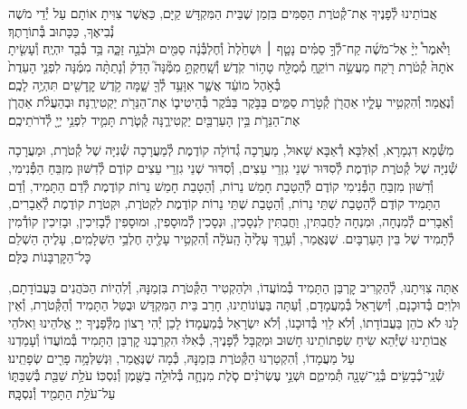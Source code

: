 \documentclass[twoside, openany, parskip=half, 11pt]{book}
\begin{document}
\newcommand{\ketoret}{
\firstword{אַתָּה הוּא יְיָ אֱלֹהֵינוּ שֶׁהִקְטִירוּ}
אֲבוֹתֵינוּ לְ֯פָנֶיךָ אֶת־קְ֯טֹרֶת הַסַּמִּים בִּזְמַן שֶׁבֵּית הַמִּקְדָּשׁ קַיָּם, כַּאֲשֶׁר צִוִּיתָ אוֹתָם עַל יְ֯דֵי מֹשֶׁה נְ֯בִיאֶךָ, כַּכָּתוּב בְּ֯תוֹרָתֶךָ׃\\
וַיֹּ֩אמֶר֩ יְיָ֨ אֶל־מֹשֶׁ֜ה קַח־לְ֯ךָ֣ סַמִּ֗ים\source{שמות ל} נָטָ֤ף ׀ וּשְׁחֵ֙לֶת֙ וְ֯חֶלְבְּ֯נָ֔ה סַמִּ֖ים וּלְבֹנָ֣ה זַכָּ֑ה בַּ֥ד בְּ֯בַ֖ד יִהְיֶֽה׃ וְ֯עָשִׂ֤יתָ אֹתׇהּ֙ קְ֯טֹ֔רֶת רֹ֖קַח מַעֲשֵׂ֣ה רוֹקֵ֑חַ מְ֯מֻלָּ֖ח טָה֥וֹר קֹֽדֶשׁ׃ וְ֯שָֽׁחַקְתָּ֣ מִמֶּ֘נָּה֮ הָדֵק֒ וְ֯נָתַתָּ֨ה מִמֶּ֜נָּה לִפְנֵ֤י הָעֵדֻת֙ בְּ֯אֹ֣הֶל מוֹעֵ֔ד אֲשֶׁ֛ר אִוָּעֵ֥ד לְ֯ךָ֖ שָׁ֑מָּה קֹ֥דֶשׁ קׇֽדָשִׁ֖ים תִּהְיֶ֥ה לָכֶֽם׃\\
וְ֯נֶאֱמַר׃ וְ֯הִקְטִ֥יר עָלָ֛יו אַהֲרֹ֖ן קְ֯טֹ֣רֶת סַמִּ֑ים בַּבֹּ֣קֶר בַּבֹּ֗קֶר בְּ֯הֵיטִיב֛וֹ אֶת־הַנֵּרֹ֖ת יַקְטִירֶֽנָּה׃ וּבְהַעֲלֹ֨ת אַהֲרֹ֧ן אֶת־הַנֵּרֹ֛ת בֵּ֥ין הָעַרְבַּ֖יִם יַקְטִירֶ֑נָּה קְ֯טֹ֧רֶת תָּמִ֛יד לִפְנֵ֥י יְיָ֖ לְ֯דֹרֹתֵיכֶֽם׃


}
\\
\tamid
\\
\ketoret
{}  מִשְּׁ֯מָא דִגְמָרָא, וְ֯אַלִּבָּא דְ֯אַבָּא שָׁאוּל, מַעֲרָכָה גְ֯דוֹלָה קוֹדֶמֶת לְ֯מַעֲרָכָה שְׁ֯נִיָּה שֶׁל קְ֯טֹרֶת, וּמַעֲרָכָה שְׁ֯נִיָּה שֶׁל קְ֯טֹרֶת קוֹדֶמֶת לְ֯סִדּוּר שְׁנֵי גִזְרֵי עֵצִים, וְ֯סִדּוּר שְׁנֵי גִזְרֵי עֵצִים קוֹדֶם לְ֯דִשּׁוּן מִזְבֵּחַ הַפְּ֯נִימִי, וְ֯דִשּׁוּן מִזְבֵּחַ הַפְּ֯נִימִי קוֹדֶם לְ֯הַטָבַת חָמֵשׁ נֵרוֹת, וְ֯הַטָבַת חָמֵשׁ נֵרוֹת קוֹדֶמֶת לְ֯דַם הַתָּמִיד, וְ֯דַם הַתָּמִיד קוֹדֶם לְ֯הַטָבַת שְׁתֵּי נֵרוֹת, וְ֯הַטָבַת שְׁתֵּי נֵרוֹת קוֹדֶמֶת לִקְטֹרֶת, וּקְטֹרֶת קוֹדֶמֶת לְ֯אֵבָרִים, וְ֯אֵבָרִים לְ֯מִנְחָה, וּמִנְחָה לַחֲבִתִּין, וַחֲבִתִּין לִנְסָכִין, וּנְסָכִין לְ֯מוּסָפִין, וּמוּסָפִין לְ֯בָזִיכִין, וּבָזִיכִין קוֹדְ֯מִין לְ֯תָמִיד שֶׁל בֵּין הָעַרְבָּיִם. שֶׁנֶּאֱמַר, וְ֯עָרַ֤ךְ  עָלֶ֙יהָ֙ הָֽעֹלָ֔ה וְ֯הִקְטִ֥יר עָלֶ֖יהָ חֶלְבֵ֥י הַשְּׁלָמִֽים׃, עָלֶיהָ הַשְׁלֵם כׇּל־הַקׇּרְבָּנוֹת כֻּלָּם׃

 אַתָּה צִוִּיתָנוּ, לְ֯הַקְרִיב קׇרְבַּן הַתָּמִיד בְּ֯מוֹעֲדוֹ, וּלְהַקְטִיר הַקְּ֯טֹרֶת בִּזְמַנׇּהּ, וְ֯לִהְיוֹת הַכֹּהֲנִים בַּעֲבוֹדָתָם, וּלְוִיִּם בְּ֯דוּכָנָם, וְ֯יִשְׂרָאֵל בְּ֯מַעֲמָדָם, וְ֯עַתָּה בַּעֲוֹנוֹתֵינוּ, חָרַב בֵּית הַמִּקְדָּשׁ וּבֻטַּל הַתָּמִיד וְ֯הַקְּ֯טֹרֶת, וְ֯אֵין לָנוּ לֹא כֹהֵן בַּעֲבוֹדָתוֹ, וְ֯לֹא לֵוִי בְּ֯דוּכָנוֹ, וְ֯לֹא יִשְׂרָאֵל בְּ֯מַעֲמָדוֹ׃ לָכֵן יְ֯הִי רָצוֹן מִלְּ֯פָנֶיךָ יְיָ אֱלֹהֵינוּ וֵאלֹהֵי אֲבוֹתֵינוּ שֶׁיְּ֯הֵא שִׂיחַ שִׂפְתוֹתֵינוּ חָשׁוּב וּמְקֻבָּל לְ֯פָנֶיךָ, כְּ֯אִלּוּ הִקְרַבְנוּ קׇרְבַּן הַתָּמִיד בְּ֯מוֹעֲדוֹ וְ֯עָמַדְנוּ עַל מַעֲמָדוֹ, וְ֯הִקְטַרְנוּ הַקְּ֯טֹרֶת בִּזְמַנׇּהּ, כְּ֯מָה שֶׁנֶּאֱמַר, וּֽנְשַׁלְּמָ֥ה  פָרִ֖ים שְׂפָתֵֽינוּ׃\\
\shabbos
{}
שְׁ֯נֵֽי־כְ֯בָשִׂ֥ים בְּ֯נֵֽי־שָׁנָ֖ה תְּ֯מִימִ֑ם וּשְׁנֵ֣י עֶשְׂרֹנִ֗ים סֹ֧לֶת מִנְחָ֛ה בְּ֯לוּלָ֥ה בַשֶּׁ֖מֶן וְ֯נִסְכּֽוֹ׃
עֹלַ֥ת שַׁבַּ֖ת בְּ֯שַׁבַּתּ֑וֹ עַל־עֹלַ֥ת הַתָּמִ֖יד וְ֯נִסְכׇּֽהּ׃
\end{document}
